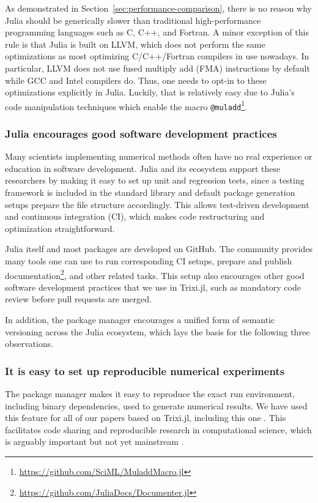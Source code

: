\documentclass[hidelinks]{juliacon} %
\newcommand{\trixi}{Trixi.jl\xspace}
\begin{document}
As demonstrated in Section~\ref{sec:performance-comparison}, there is no reason
why Julia should be generically slower than traditional high-performance programming
languages such as C, C++, and Fortran. A minor exception of this rule is that
Julia is built on LLVM, which does not perform the same optimizations as most
optimizing C/C++/Fortran compilers in use nowadays. In particular, LLVM does
not use fused multiply add (FMA) instructions by default while GCC and Intel
compilers do. Thus, one needs to opt-in to these optimizations explicitly in
Julia. Luckily, that is relatively easy due to Julia's code manipulation
techniques which enable the macro \lstinline{@muladd}\footnote{\url{https://github.com/SciML/MuladdMacro.jl}}.

\subsubsection{Julia encourages good software development practices}

Many scientists implementing numerical methods often have no real experience or
education in software development. Julia and its ecosystem support these
researchers by making it easy to set up unit and regression tests, since a
testing framework is included in the standard library and default package
generation setups prepare the file structure accordingly. This allows test-driven
development and continuous integration (CI), which makes code restructuring
and optimization straightforward.

Julia itself and most packages are developed on GitHub. The community provides
many tools one can use to run corresponding CI setups, prepare and publish
documentation\footnote{\url{https://github.com/JuliaDocs/Documenter.jl}},
and other related tasks. This setup also encourages other good software development
practices that we use in \trixi, such as mandatory code review before pull requests
are merged.

In addition, the package manager encourages a unified form of semantic versioning
across the Julia ecosystem, which lays the basis for the following three
observations.

\subsubsection{It is easy to set up reproducible numerical experiments}

The package manager makes it easy to reproduce the exact run environment, including
binary dependencies, used to generate numerical results. We have used this feature for all of our papers based on
\trixi \cite{schlottkelakemper2021purely, ranocha2021preventing}, including this
one \cite{ranocha2021adaptiveRepro}.
This facilitates code sharing and reproducible research in computational science,
which is arguably important but not yet mainstream \cite{barnes2010publish,
donoho2010invitation, leveque2013top}.
\end{document}
